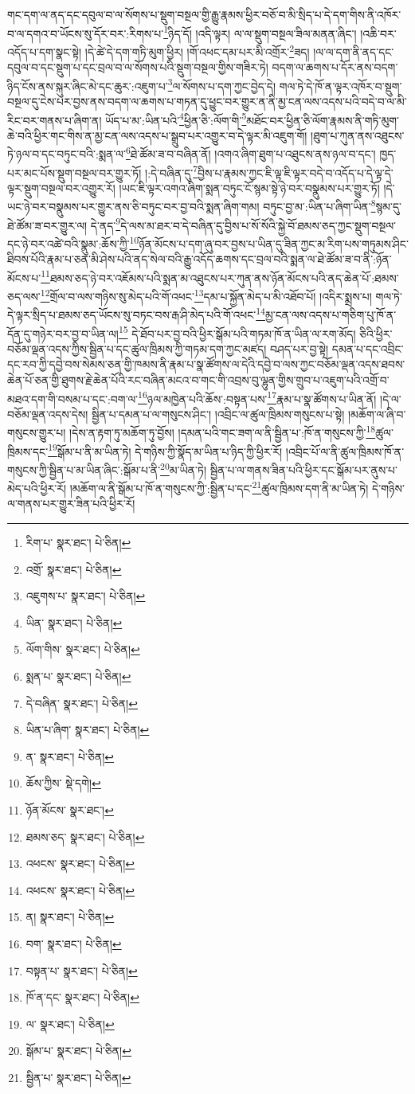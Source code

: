 གང་དག་ལ་ནད་དང་དབུལ་བ་ལ་སོགས་པ་སྡུག་བསྔལ་གྱི་རྒྱུ་རྣམས་ཕྱིར་བཅོ་བ་མི་སྲིད་པ་དེ་དག་གིས་ནི་འཁོར་བ་ལ་དགའ་བ་ཡོངས་སུ་དོར་བར་:རིགས་པ་\footnote{རིག་པ་  སྣར་ཐང་།  པེ་ཅིན། }ཉིད་དོ། །འདི་ལྟར། ལ་ལ་སྡུག་བསྔལ་ཟིལ་མནན་ཞིང་། །འཆི་བར་འདོད་པ་དག་སྣང་སྟེ། །དེ་ཚེ་དེ་དག་གཏི་མུག་ཕྱིར། །གོ་འཕང་དམ་པར་མི་འགྲོར་\footnote{འགྲོ་  སྣར་ཐང་།  པེ་ཅིན། }ཟད། །ལ་ལ་དག་ནི་ནད་དང་དབུལ་བ་དང་སྡུག་པ་དང་བྲལ་བ་ལ་སོགས་པའི་སྡུག་བསྔལ་གྱིས་གཟིར་ཏེ། བདག་ལ་ཆགས་པ་དོར་ནས་བདག་ཉིད་ངོས་ནས་སྐུར་ཞིང་མེ་དང་ཆུར་:འཇུག་པ་\footnote{འཇུགས་པ་  སྣར་ཐང་།  པེ་ཅིན། }ལ་སོགས་པ་དག་ཀྱང་བྱེད་དེ། གལ་ཏེ་དེ་ཁོ་ན་ལྟར་འཁོར་བ་སྡུག་བསྔལ་དུ་ངེས་པར་བྱས་ནས་བདག་ལ་ཆགས་པ་གཏན་དུ་ཕྱུང་བར་གྱུར་ན་ནི་མྱ་ངན་ལས་འདས་པའི་བདེ་བ་ལ་མི་རིང་བར་གནས་པ་ཞིག་ན། ཡོད་པ་མ་:ཡིན་པའི་\footnote{ཡིན་  སྣར་ཐང་།  པེ་ཅིན། }ཕྱིན་ཅི་:ལོག་གི་\footnote{ལོག་གིས་  སྣར་ཐང་།  པེ་ཅིན། }མཐོང་བར་ཕྱིན་ཅི་ལོག་རྣམས་ནི་གཏི་མུག་ཆེ་བའི་ཕྱིར་གང་གིས་ན་མྱ་ངན་ལས་འདས་པ་སྒྲུབ་པར་འགྱུར་བ་དེ་ལྟར་མི་འཇུག་གོ། །ཐུག་པ་ཀུན་ནས་འཐུངས་ཏེ་ཉལ་བ་དང་བཏུང་བའི་:སྨན་ལ་\footnote{སྨན་པ་  སྣར་ཐང་།  པེ་ཅིན། }ཐེ་ཚོམ་ཟ་བ་བཞིན་ནོ། །འགའ་ཞིག་ཐུག་པ་འཐུངས་ནས་ཉལ་བ་དང་། ཁྱད་པར་མང་པོས་སྡུག་བསྔལ་བར་གྱུར་ཏོ། །:དེ་བཞིན་དུ་\footnote{དེ་བཞིན་  སྣར་ཐང་།  པེ་ཅིན། }བྱིས་པ་རྣམས་ཀྱང་ཇི་ལྟ་ཇི་ལྟར་བདེ་བ་འདོད་པ་དེ་ལྟ་དེ་ལྟར་སྡུག་བསྔལ་བར་འགྱུར་རོ། །ཡང་ཇི་ལྟར་འགའ་ཞིག་སྨན་བཏུང་ངོ་སྙམ་སྟེ་ཉེ་བར་བསྣུམས་པར་གྱུར་ཏོ། །དེ་ཡང་ཉེ་བར་བསྣུམས་པར་གྱུར་ནས་ཅི་བཏུང་བར་བྱ་བའི་སྨན་ཞིག་གམ། བཏུང་བྱ་མ་:ཡིན་པ་ཞིག་ཡིན་\footnote{ཡིན་པ་ཞིག་  སྣར་ཐང་།  པེ་ཅིན། }སྙམ་དུ་ཐེ་ཚོམ་ཟ་བར་གྱུར་ལ། དེ་ནད་\footnote{ན་  སྣར་ཐང་།  པེ་ཅིན། }དེ་ལས་མ་ཐར་བ་དེ་བཞིན་དུ་བྱིས་པ་སོ་སོའི་སྐྱེ་བོ་ཐམས་ཅད་ཀྱང་སྡུག་བསྔལ་དང་ཉེ་བར་འཚེ་བའི་སྣུམ་:ཆོས་ཀྱི་\footnote{ཆོས་ཀྱིས་  སྡེ་དགེ། }ཉོན་མོངས་པ་དག་ཞུ་བར་བྱས་པ་ཡིན་དུ་ཟིན་ཀྱང་མ་རིག་པས་གཏུམས་ཤིང་ཐིབས་པོའི་རྣམ་པ་ཅན་མི་ཤེས་པའི་ནད་སེལ་བའི་རྒྱུ་འདོད་ཆགས་དང་བྲལ་བའི་སྨན་ལ་ཐེ་ཚོམ་ཟ་བ་ནི་:ཉོན་མོངས་པ་\footnote{ཉོན་མོངས་  སྣར་ཐང་། }ཐམས་ཅད་ཉེ་བར་འཇོམས་པའི་སྨན་མ་འཐུངས་པར་ཀུན་ནས་ཉོན་མོངས་པའི་ནད་ཆེན་པོ་:ཐམས་ཅད་ལས་\footnote{ཐམས་ཅད་  སྣར་ཐང་།  པེ་ཅིན། }གྲོལ་བ་ལས་གཉིས་སུ་མེད་པའི་གོ་འཕང་\footnote{འཕངས་  སྣར་ཐང་།  པེ་ཅིན། }དམ་པ་སྐྱོན་མེད་པ་མི་འཐོབ་པོ། །འདིར་སྨྲས་པ། གལ་ཏེ་དེ་ལྟར་སྲིད་པ་ཐམས་ཅད་ཡོངས་སུ་བཏང་བས་རྒ་ཤི་མེད་པའི་གོ་འཕང་\footnote{འཕངས་  སྣར་ཐང་།  པེ་ཅིན། }མྱ་ངན་ལས་འདས་པ་གཅིག་པུ་ཁོ་ན་དོན་དུ་གཉེར་བར་བྱ་བ་ཡིན་ལ།\footnote{ན།  སྣར་ཐང་།  པེ་ཅིན། } དེ་ཐོབ་པར་བྱ་བའི་ཕྱིར་སྒོམ་པའི་གཏམ་ཁོ་ན་ཡིན་ལ་རག་མོད། ཅིའི་ཕྱིར་བཅོམ་ལྡན་འདས་ཀྱིས་སྦྱིན་པ་དང་ཚུལ་ཁྲིམས་ཀྱི་གཏམ་དག་ཀྱང་མཛད། བཤད་པར་བྱ་སྟེ། དམན་པ་དང་འབྲིང་དང་རབ་ཀྱི་དབྱེ་བས་སེམས་ཅན་གྱི་ཁམས་ནི་རྣམ་པ་སྣ་ཚོགས་ལ་དེའི་དབྱེ་བ་ལས་ཀྱང་བཅོམ་ལྡན་འདས་ཐབས་ཆེན་པོ་ཅན་གྱི་ཐུགས་རྗེ་ཆེན་པོའི་རང་བཞིན་མངའ་བ་གང་གི་འབྲས་བུ་ལྷུན་གྱིས་གྲུབ་པ་འཇུག་པའི་འགྲོ་བ་མཐའ་དག་གི་བསམ་པ་དང་:བག་ལ་\footnote{བག་  སྣར་ཐང་།  པེ་ཅིན། }ཉལ་མཁྱེན་པའི་ཆོས་:བསྟན་པས་\footnote{བསྟན་པ་  སྣར་ཐང་།  པེ་ཅིན། }རྣམ་པ་སྣ་ཚོགས་པ་ཡིན་ནོ། །དེ་ལ་བཅོམ་ལྡན་འདས་དེས། སྦྱིན་པ་དམན་པ་ལ་གསུངས་ཤིང་། །འབྲིང་ལ་ཚུལ་ཁྲིམས་གསུངས་པ་སྟེ། །མཆོག་ལ་ཞི་བ་གསུངས་གྱུར་པ། །དེས་ན་རྟག་ཏུ་མཆོག་ཏུ་བྱོས། །དམན་པའི་གང་ཟག་ལ་ནི་སྦྱིན་པ་:ཁོ་ན་གསུངས་ཀྱི་\footnote{ཁོ་ན་དང་  སྣར་ཐང་།  པེ་ཅིན། }ཚུལ་ཁྲིམས་དང་\footnote{ལ་  སྣར་ཐང་།  པེ་ཅིན། }སྒོམ་པ་ནི་མ་ཡིན་ཏེ། དེ་གཉིས་ཀྱི་སྣོད་མ་ཡིན་པ་ཉིད་ཀྱི་ཕྱིར་རོ། །འབྲིང་པོ་ལ་ནི་ཚུལ་ཁྲིམས་ཁོ་ན་གསུངས་ཀྱི་སྦྱིན་པ་མ་ཡིན་ཞིང་:སྒོམ་པ་ནི་\footnote{སྒོམ་པ་  སྣར་ཐང་།  པེ་ཅིན། }མ་ཡིན་ཏེ། སྦྱིན་པ་ལ་གནས་ཟིན་པའི་ཕྱིར་དང་སྒོམ་པར་ནུས་པ་མེད་པའི་ཕྱིར་རོ། །མཆོག་ལ་ནི་སྒོམ་པ་ཁོ་ན་གསུངས་ཀྱི་:སྦྱིན་པ་དང་\footnote{སྦྱིན་པ་  སྣར་ཐང་།  པེ་ཅིན། }ཚུལ་ཁྲིམས་དག་ནི་མ་ཡིན་ཏེ། དེ་གཉིས་ལ་གནས་པར་གྱུར་ཟིན་པའི་ཕྱིར་རོ། 